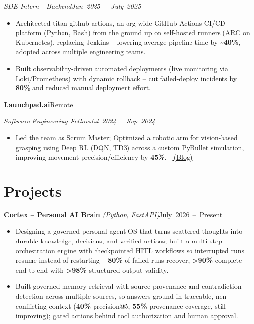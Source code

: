\documentclass[10pt,letterpaper]{article}
\newcommand{\resumeHeading}[4]{%
  \par\noindent\textbf{#1}\hfill\mbox{#2}\par
  \noindent\textit{#3}\hfill\mbox{\textit{#4}}\par
}
\newcommand{\projectHeading}[3]{%
  \par\noindent\textbf{#1} \textit{(#2)}\hfill\mbox{#3}\par
}
\begin{document}
\noindent\textit{SDE Intern - Backend}\hfill\mbox{\textit{Jan 2025 -- July 2025}}\par
\begin{itemize}
\item Architected titan-github-actions, an org-wide GitHub Actions CI/CD platform (Python, Bash) from the ground up on self-hosted runners (ARC on Kubernetes), replacing Jenkins -- lowering average pipeline time by \textbf{\textasciitilde 40\%}, adopted across multiple engineering teams.
\item Built observability-driven automated deployments (live monitoring via Loki/Prometheus) with dynamic rollback -- cut failed-deploy incidents by \textbf{80\%} and reduced manual deployment effort.
\end{itemize}

\resumeHeading{Launchpad.ai}{Remote}{Software Engineering Fellow}{Jul 2024 -- Sep 2024}
\begin{itemize}
\item Led the team as Scrum Master; Optimized a robotic arm for vision-based grasping using Deep RL (DQN, TD3) across a custom PyBullet simulation, improving movement precision/efficiency by \textbf{45\%}. \textbar\ \href{https://medium.com/@gauthamsathyan/automating-sunscreen-application-with-robotics-a-deep-dive-into-two-approaches-34304dbdd719}{\textnormal{{\faExternalLink}\,\normalsize (Blog)}}
\end{itemize}

\section{Projects}
\projectHeading{Cortex -- Personal AI Brain}{Python, FastAPI}{\scriptsize\normalsize July 2026 -- Present}
\begin{itemize}
  \item Designing a governed personal agent OS that turns scattered thoughts into durable knowledge, decisions, and verified actions; built a multi-step orchestration engine with checkpointed HITL workflows so interrupted runs resume instead of restarting -- \textbf{80\%} of failed runs recover, \textbf{>90\%} complete end-to-end with \textbf{>98\%} structured-output validity.
  \item Built governed memory retrieval with source provenance and contradiction detection across multiple sources, so answers ground in traceable, non-conflicting context (\textbf{40\%} precision@5, \textbf{55\%} provenance coverage, still improving); gated actions behind tool authorization and human approval.
\end{itemize}
\end{document}
